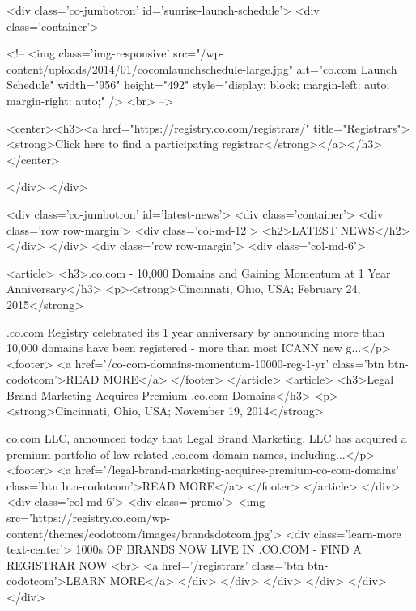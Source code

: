     <div class='co-jumbotron' id='sunrise-launch-schedule'>
        <div class='container'>

<!--  <img class='img-responsive' src="/wp-content/uploads/2014/01/cocomlaunchschedule-large.jpg" alt="co.com Launch Schedule" width="956" height="492" style="display: block; margin-left: auto; margin-right: auto;" />
<br>
-->
      
<center><h3><a href="https://registry.co.com/registrars/" title="Registrars"><strong>Click here to find a participating registrar</strong></a></h3></center>

        </div>
    </div>

    <div class='co-jumbotron' id='latest-news'>
        <div class='container'>
            <div class='row row-margin'>
                <div class='col-md-12'>
                    <h2>LATEST NEWS</h2>
                </div>
            </div>
            <div class='row row-margin'>
                <div class='col-md-6'>
                     
                                        <article>
                        <h3>.co.com - 10,000 Domains and Gaining Momentum at 1 Year Anniversary</h3>
                        <p><strong>Cincinnati, Ohio, USA; February 24, 2015</strong>

.co.com Registry celebrated its 1 year anniversary by announcing more than 10,000 domains have been registered - more than most ICANN new g...</p>
                        <footer>
                            <a href='/co-com-domains-momentum-10000-reg-1-yr' class='btn btn-codotcom'>READ MORE</a>
                        </footer>
                    </article>
                                        <article>
                        <h3>Legal Brand Marketing Acquires Premium .co.com Domains</h3>
                        <p><strong>Cincinnati, Ohio, USA; November 19, 2014</strong>

co.com LLC, announced today that Legal Brand Marketing, LLC has acquired a premium portfolio of law-related .co.com domain names, including...</p>
                        <footer>
                            <a href='/legal-brand-marketing-acquires-premium-co-com-domains' class='btn btn-codotcom'>READ MORE</a>
                        </footer>
                    </article>
                                    </div>
                <div class='col-md-6'>
                    <div class='promo'>
                        <img src='https://registry.co.com/wp-content/themes/codotcom/images/brandsdotcom.jpg'>
                        <div class='learn-more text-center'>
                            1000s OF BRANDS NOW LIVE IN .CO.COM - FIND A REGISTRAR NOW
                            <br>
                            <a href='/registrars' class='btn btn-codotcom'>LEARN MORE</a>
                        </div>
                    </div>
                </div>
            </div>
        </div>
    </div>

